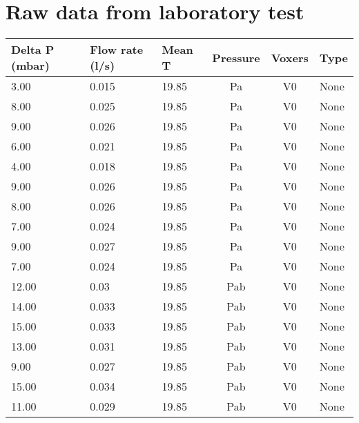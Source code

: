 \chapter{Raw data from laboratory test}\label{appx:fourth}

\begin{table}[b!]
\centering
\begin{tabular}{l | l | l | c | c | l}
Delta P (mbar) & Flow rate (l/s) & Mean T & Pressure & Voxers & Type                \\ \hline
3.00           & 0.015           & 19.85  & Pa       & V0     & None                \\
8.00           & 0.025           & 19.85  & Pa       & V0     & None                \\
9.00           & 0.026           & 19.85  & Pa       & V0     & None                \\
6.00           & 0.021           & 19.85  & Pa       & V0     & None                \\
4.00           & 0.018           & 19.85  & Pa       & V0     & None                \\
9.00           & 0.026           & 19.85  & Pa       & V0     & None                \\
8.00           & 0.026           & 19.85  & Pa       & V0     & None                \\
7.00           & 0.024           & 19.85  & Pa       & V0     & None                \\
9.00           & 0.027           & 19.85  & Pa       & V0     & None                \\
7.00           & 0.024           & 19.85  & Pa       & V0     & None                \\
12.00          & 0.03            & 19.85  & Pab      & V0     & None                \\
14.00          & 0.033           & 19.85  & Pab      & V0     & None                \\
15.00          & 0.033           & 19.85  & Pab      & V0     & None                \\
13.00          & 0.031           & 19.85  & Pab      & V0     & None                \\
9.00           & 0.027           & 19.85  & Pab      & V0     & None                \\
15.00          & 0.034           & 19.85  & Pab      & V0     & None                \\
11.00          & 0.029           & 19.85  & Pab      & V0     & None                \\

\end{tabular}
\end{table}
